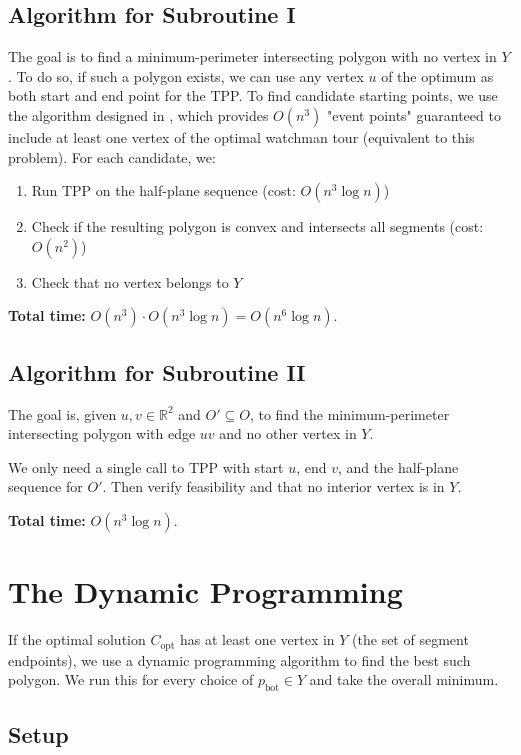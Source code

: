 \documentclass{article}
\begin{document}
\subsection{Algorithm for Subroutine I}

The goal is to find a minimum-perimeter intersecting polygon with no vertex in $Y$. To do so, 
if such a polygon exists, we can use any vertex $u$ of the
optimum as both start and end point for the TPP. To find candidate starting
points, we use the algorithm designed in \cite{10.1007/3-540-57568-5_235}, which
provides $O(n^3)$ "event points" guaranteed to include at least one vertex of
the optimal watchman tour (equivalent to this problem). For each candidate, we:
\begin{enumerate}
\item Run TPP on the half-plane sequence (cost: $O(n^3 \log n)$)
\item Check if the resulting polygon is convex and intersects all segments
      (cost: $O(n^2)$)
\item Check that no vertex belongs to $Y$
\end{enumerate}

\textbf{Total time:} $O(n^3) \cdot O(n^3 \log n) = O(n^6 \log n)$.

\subsection{Algorithm for Subroutine II}

The goal is, given $u, v \in \mathbb{R}^2$ and $O' \subseteq O$, to find the
minimum-perimeter intersecting polygon with edge $uv$ and no other vertex in $Y$.

We only need a single call to TPP with start $u$, end $v$, and the half-plane
sequence for $O'$. Then verify feasibility and that no interior vertex is in $Y$.

\textbf{Total time:} $O(n^3 \log n)$.

\section{The Dynamic Programming}

If the optimal solution $C_{\text{opt}}$ has at least one vertex in $Y$ (the set
of segment endpoints), we use a dynamic programming algorithm to find the
best such polygon. We run this for every choice of $p_{\text{bot}} \in Y$ and
take the overall minimum.

\subsection{Setup}
\end{document}
